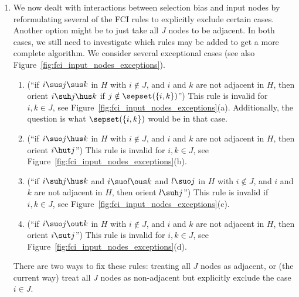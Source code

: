{\begin{enumerate}
  \item We now dealt with interactions between selection bias and input nodes by reformulating several of the FCI rules to explicitly exclude certain cases.
    Another option might be to just take all $J$ nodes to be adjacent. In both cases, we still need to investigate which rules may be added to get a more complete algorithm.
    We consider several exceptional cases (see also Figure~\ref{fig:fci_input_nodes_exceptions}).
    \begin{enumerate}
      \item[$\C{R}0$] (``if $i \sus j \sus k$ in $H$ with $i \notin J$, and $i$ and $k$ are not adjacent in $H$, then orient $i \suh j \hus k$ if $j \notin \sepset(\{i,k\})$'')
        This rule is invalid for $i,k \in J$, see Figure~\ref{fig:fci_input_nodes_exceptions}(a). Additionally, the question is what $\sepset(\{i,k\})$ would be in that case. 
      \item[$\C{R}1$] (``if $i \suo j \hus k$ in $H$ with $i \notin J$, and $i$ and $k$ are not adjacent in $H$, then orient $i \hut j$'')
        This rule is invalid for $i,k \in J$, see Figure~\ref{fig:fci_input_nodes_exceptions}(b).
      \item[$\C{R}3$] (``if $i \suh j \hus k$ and $i \suo l \ous k$ and $l \suo j$ in $H$ with $i \notin J$, and $i$ and $k$ are not adjacent in $H$, then orient $l \suh j$'') This rule is invalid if $i,k \in J$, see Figure~\ref{fig:fci_input_nodes_exceptions}(c).
      \item[$\C{R}7$] (``if $i \suo j \out k$ in $H$ with $i \notin J$, and $i$ and $k$ are not adjacent in $H$, then orient $i \sut j$'')
        This rule is invalid for $i,k \in J$, see Figure~\ref{fig:fci_input_nodes_exceptions}(d).
    \end{enumerate}
    There are two ways to fix these rules: treating all $J$ nodes as adjacent, or (the current way) treat all $J$ nodes as non-adjacent but explicitly exclude the case $i \in J$.
    \begin{figure}
\end{figure}
\end{enumerate}}
